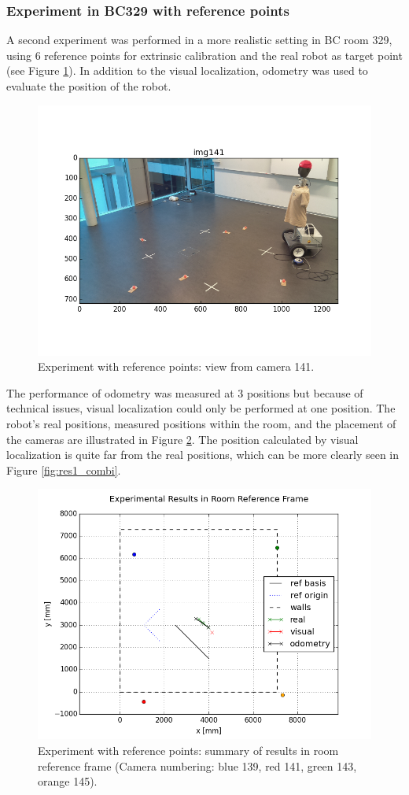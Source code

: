 \subsubsection{Experiment in BC329 with reference points}

A second experiment was performed in a more realistic setting in BC room 329, using 6 reference points for extrinsic calibration and the real robot as target point (see Figure \ref{fig:res1_img}). 
In addition to the visual localization, odometry was used to evaluate the position of the robot.
\begin{figure}
    \centering
    \includegraphics[width=.6\linewidth]{files/res1_img141.png}
    \caption{Experiment with reference points: view from camera 141.}
    \label{fig:res1_img}
\end{figure}
The performance of odometry was measured at 3 positions but because of technical issues, visual localization could only be performed at one position. 
The robot's real positions, measured positions within the room, and the placement of the cameras are illustrated in Figure \ref{fig:res1_room}.
The position calculated by visual localization is quite far from the real positions, which can be more clearly seen in Figure \ref{fig:res1_combi}. 

\begin{figure}
    \centering
    \includegraphics[width=.8\linewidth]{files/res1_room.png}
    \caption{Experiment with reference points: summary of results in room reference frame (Camera numbering: blue 139, red 141, green 143, orange 145).}
    \label{fig:res1_room}
\end{figure}

